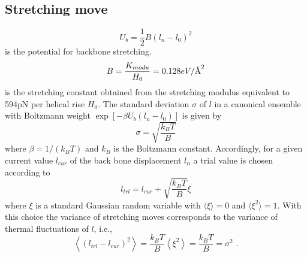 \documentclass[12pt,masters,final]{UTRGVthesis}
\begin{document}
\subsection{Stretching move} {\label{smv}}
\begin{equation}\label{stm}
U_b = \frac{1}{2} B \left(l_n-l_{0}\right)^2
\end{equation}
%
 is the potential for backbone stretching.
%
\begin{equation}\label{bc}
B=\frac{K_{modu}}{H_{0}} = 0.128 eV/\text{\normalfont\AA}^2
\end{equation}
%  
is the stretching constant obtained from the stretching modulus equivalent to 594pN per helical rise $H_{0}$. The standard deviation $\sigma$ of $l$ in a canonical ensemble with Boltzmann weight
$\exp\left[-\beta U_b\left(l_n-l_0\right) \right]$ is given by
%
\begin{equation} \label{ssd}
  \sigma = \sqrt{\frac{k_B T}{B}}
\end{equation}
%
where $\beta = 1 / (k_B T)$ and $k_B$ is the Boltzmann constant.
%
Accordingly, for a given current value $l_{cur}$ of the back bone displacement $l_n$ a trial value
is chosen according to
%
\begin{equation} \label{ltrl}
l_{trl} = l_{cur} + \sqrt{\frac{k_BT}{B}} \xi
\end{equation}
%
where $\xi$ is a standard Gaussian random variable with $\langle \xi \rangle = 0$ and
$\langle \xi^2 \rangle = 1$. With this choice the variance of stretching moves
corresponds to the variance of thermal fluctuations of $l$, i.e.,
%
\begin{equation} \label{lvar} 
  \left< \left(l_{trl} - l_{cur} \right)^2 \right> = \frac{k_{B}T}{B} \left< \xi^2 \right> =
  \frac{k_{B}T}{B} = \sigma^2 \, \, .
\end{equation}
%
\newpage
\end{document}
